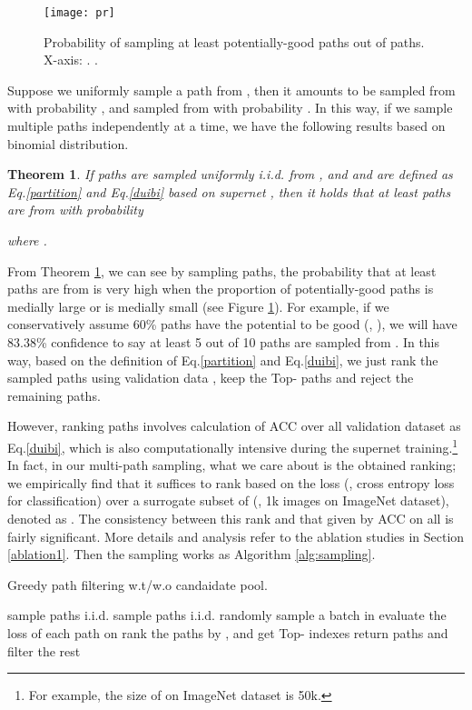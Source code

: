 \documentclass[10pt,twocolumn,letterpaper]{article}
\newtheorem{theorem}{Theorem}\newtheorem{lemma}{Lemma}
\begin{document}
\begin{figure}[t]
	\centering
	\texttt{[image: pr]}
	\vspace{-3mm}
	\caption{Probability of sampling at least  potentially-good paths out of  paths. X-axis: . .}
	\vspace{-5mm}
	\label{fig:pr}
\end{figure}


Suppose we uniformly sample a path from , then it amounts to be sampled from  with probability , and sampled from  with probability . In this way, if we sample multiple paths independently at a time, we have the following results based on binomial distribution. 
\begin{theorem}\label{theorem:pr}
	If  paths are sampled uniformly i.i.d. from , and  and  are defined as Eq.\eqref{partition} and Eq.\eqref{duibi} based on supernet , then it holds that at least  paths are from  with probability
	
	where . 
\end{theorem}
From Theorem \ref{theorem:pr}, we can see by sampling  paths, the probability that at least  paths are from  is very high when the 
proportion of potentially-good paths  is medially large or  is medially small (see Figure \ref{fig:pr}). For example, if we conservatively assume 60\% paths have the potential to be good (\ie, ), we will have 83.38\% confidence to say at least 5 out of 10 paths are sampled from . In this way, based on the definition of Eq.\eqref{partition} and Eq.\eqref{duibi}, we just rank the sampled  paths using validation data , keep the Top- paths and reject the remaining paths.

However, ranking  paths involves calculation of ACC over all validation dataset  as Eq.\eqref{duibi}, which is also computationally intensive during the supernet training.\footnote{For example, the size of  on ImageNet dataset is 50k.} In fact, in our multi-path sampling, what we care about is the obtained ranking; we empirically find that it suffices to rank based on the loss  (\eg, cross entropy loss for classification) over a surrogate subset of  (\eg, 1k images on ImageNet dataset), denoted as . The consistency between this rank and that given by ACC on all  is fairly significant. More details and analysis refer to the ablation studies in Section \ref{ablation1}. Then the sampling works as Algorithm \ref{alg:sampling}.




\begin{algorithm}[tb]
	\caption{Greedy path filtering w.t/w.o candaidate pool.}
	\label{alg:sampling}
	\begin{algorithmic}[1]
		\STATE sample  paths  i.i.d. \wrt  
		\ELSE
		\STATE sample  paths  i.i.d. \wrt  
		\ENDIF
		\STATE randomly sample a batch  in  
		\STATE evaluate the loss  of each path  on 
		\STATE rank the paths by , and get Top- indexes 
		\STATE return  paths  and filter the rest
	\end{algorithmic}
\end{algorithm}
\end{document}
